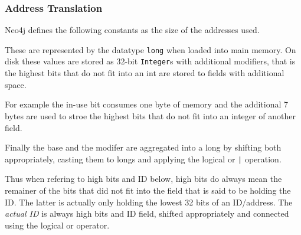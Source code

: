 \documentclass[a4paper,10pt]{article}
\begin{document}
        \subsubsection{Address Translation}
            Neo4j defines the following constants as the size of the addresses used.
            \begin{figure}[htp]\label{addrsize}
            \end{figure}
            These are represented by the datatype \texttt{long} when loaded into main memory. On disk these values are stored as 32-bit \texttt{Integer}s with additional modifiers, that is the highest bits that do not fit into an int are stored to fields with additional space.
            
            For example the in-use bit consumes one byte of memory and the additional 7 bytes are used to stroe the highest bits that do not fit into an integer of another field.
            
            Finally the base and the modifer are aggregated into a long by shifting both appropriately, casting them to longs and applying the logical or \texttt{|} operation.
            
            Thus when refering to high bits and ID below, high bits do always mean the remainer of the bits that did not fit into the field that is said to be holding the ID. The latter is actually only holding the lowest 32 bits of an ID/address. The \textit{actual ID} is always high bits and ID field, shifted appropriately and connected using the logical or operator.
            
\end{document}
